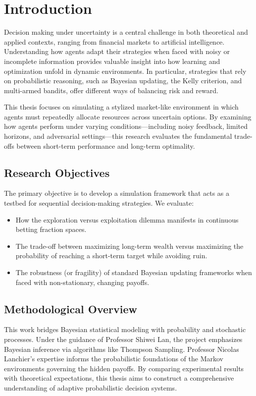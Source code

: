 \chapter{Introduction}
\label{ch:introduction}

Decision making under uncertainty is a central challenge in both theoretical and applied contexts, ranging from financial markets to artificial intelligence. Understanding how agents adapt their strategies when faced with noisy or incomplete information provides valuable insight into how learning and optimization unfold in dynamic environments. In particular, strategies that rely on probabilistic reasoning, such as Bayesian updating, the Kelly criterion, and multi-armed bandits, offer different ways of balancing risk and reward.

This thesis focuses on simulating a stylized market-like environment in which agents must repeatedly allocate resources across uncertain options. By examining how agents perform under varying conditions—including noisy feedback, limited horizons, and adversarial settings—this research evaluates the fundamental trade-offs between short-term performance and long-term optimality. 

\section{Research Objectives}
The primary objective is to develop a simulation framework that acts as a testbed for sequential decision-making strategies. We evaluate:
\begin{itemize}
    \item How the exploration versus exploitation dilemma manifests in continuous betting fraction spaces.
    \item The trade-off between maximizing long-term wealth versus maximizing the probability of reaching a short-term target while avoiding ruin.
    \item The robustness (or fragility) of standard Bayesian updating frameworks when faced with non-stationary, changing payoffs.
\end{itemize}

\section{Methodological Overview}
This work bridges Bayesian statistical modeling with probability and stochastic processes. Under the guidance of Professor Shiwei Lan, the project emphasizes Bayesian inference via algorithms like Thompson Sampling. Professor Nicolas Lanchier's expertise informs the probabilistic foundations of the Markov environments governing the hidden payoffs. By comparing experimental results with theoretical expectations, this thesis aims to construct a comprehensive understanding of adaptive probabilistic decision systems.
